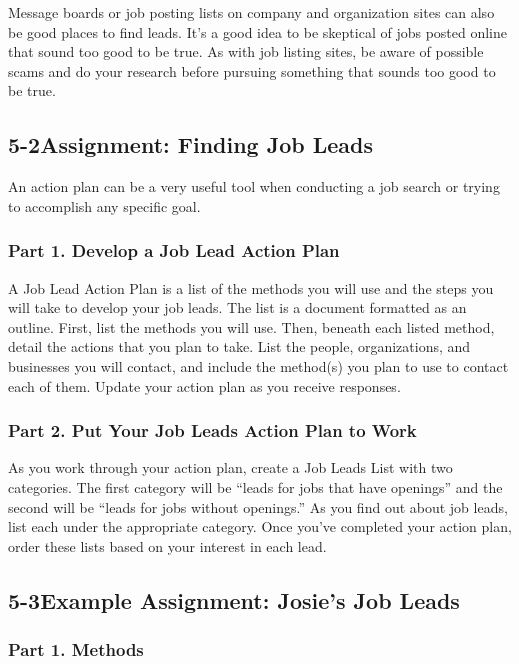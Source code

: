 Message boards or job posting lists on company and organization sites can also be good places to find leads. It's a good idea to be skeptical of jobs posted online that sound too good to be true. As with job listing sites, be aware of possible scams and do your research before pursuing something that sounds too good to be true.

\pagebreak \subsection*{5-2\quad Assignment: Finding Job Leads}
An action plan can be a very useful tool when conducting a job search or trying to accomplish any specific goal.

\subsubsection*{Part 1. Develop a Job Lead Action Plan}
A Job Lead Action Plan is a list of the methods you will use and the steps you will take to develop your job leads. The list is a document formatted as an outline. First, list the methods you will use. Then, beneath each listed method, detail the actions that you plan to take. List the people, organizations, and businesses you will contact, and include the method(s) you plan to use to contact each of them. Update your action plan as you receive responses.

\subsubsection*{Part 2. Put Your Job Leads Action Plan to Work}

As you work through your action plan, create a Job Leads List with two categories. The first category will be ``leads for jobs that have openings'' and the second will be ``leads for jobs without openings.'' As you find out about job leads, list each under the appropriate category. Once you've completed your action plan, order these lists based on your interest in each lead.
 
\pagebreak \subsection*{5-3\quad Example Assignment: Josie's Job Leads}
\subsubsection*{Part 1. Methods}

